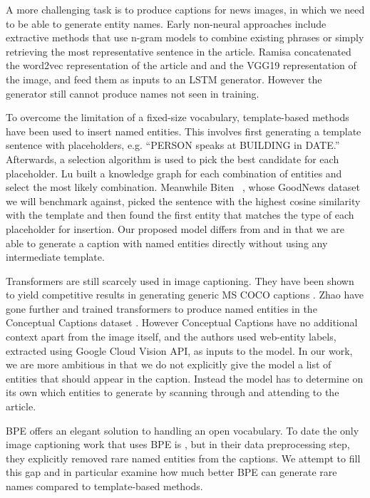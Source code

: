 \documentclass[10pt,twocolumn,letterpaper]{article}
\begin{document}
A more challenging task is to produce captions for news images, in which we
need to be able to generate entity names. Early non-neural approaches include
extractive methods that use n-gram models to combine existing phrases
\cite{Feng2013AutomaticCG} or simply retrieving the most representative
sentence \cite{Tariq2017ACE} in the article. Ramisa \etal
\cite{Ramisa2016BreakingNewsAA} concatenated the word2vec representation of the
article and and the VGG19 representation of the image, and feed them as inputs
to an LSTM generator. However the generator still cannot produce names not
seen in training.

To overcome the limitation of a fixed-size vocabulary, template-based methods
have been used to insert named entities. This involves first generating a
template sentence with placeholders, e.g. ``PERSON speaks at BUILDING in
DATE.'' Afterwards, a selection algorithm is used to pick the best candidate
for each placeholder. Lu \etal \cite{Lu2018EntityAI} built a knowledge graph
for each combination of entities and select the most likely combination.
Meanwhile Biten \etal~\cite{Biten2019GoodNews}, whose GoodNews dataset we will
benchmark against, picked the sentence with the highest cosine similarity with
the template and then found the first entity that matches the type of each
placeholder for insertion. Our proposed model differs from
\cite{Lu2018EntityAI} and \cite{Biten2019GoodNews} in that we are able to
generate a caption with named entities directly without using any intermediate
template.

Transformers are still scarcely used in image captioning. They have been shown
to yield competitive results in generating generic MS COCO captions
\cite{Zhu2018CaptioningTW, Li2019Boosted}. Zhao \etal
\cite{Zhao2019InformativeIC} have gone further and trained transformers to
produce named entities in the Conceptual Captions dataset
\cite{Sharma2018ConceptualCA}. However Conceptual Captions have no additional
context apart from the image itself, and the authors used web-entity labels,
extracted using Google Cloud Vision API, as inputs to the model. In our work,
we are more ambitious in that we do not explicitly give the model a list of
entities that should appear in the caption. Instead the model has to determine
on its own which entities to generate by scanning through and attending to the
article.

BPE offers an elegant solution to handling an open vocabulary. To date the only
image captioning work that uses BPE is \cite{Sharma2018ConceptualCA}, but in
their data preprocessing step, they explicitly removed rare named entities from
the captions. We attempt to fill this gap and in particular examine how much
better BPE can generate rare names compared to template-based methods.
\end{document}
